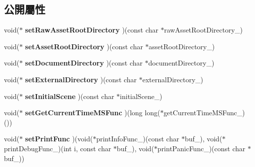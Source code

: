 \subsection*{公開屬性}
\begin{DoxyCompactItemize}
\item 
void($\ast$ {\bfseries set\+Raw\+Asset\+Root\+Directory} )(const char $\ast$raw\+Asset\+Root\+Directory\+\_\+)\hypertarget{class_magnum_1_1_game_descriptor_a81d1d7e45e4f95ffbe11dda12fca0b84}{}\label{class_magnum_1_1_game_descriptor_a81d1d7e45e4f95ffbe11dda12fca0b84}

\item 
void($\ast$ {\bfseries set\+Asset\+Root\+Directory} )(const char $\ast$asset\+Root\+Directory\+\_\+)\hypertarget{class_magnum_1_1_game_descriptor_af83c5b4ae1300af8548a745d417b3624}{}\label{class_magnum_1_1_game_descriptor_af83c5b4ae1300af8548a745d417b3624}

\item 
void($\ast$ {\bfseries set\+Document\+Directory} )(const char $\ast$document\+Directory\+\_\+)\hypertarget{class_magnum_1_1_game_descriptor_acc7208069947e3ec5e28ddadb42ba2dc}{}\label{class_magnum_1_1_game_descriptor_acc7208069947e3ec5e28ddadb42ba2dc}

\item 
void($\ast$ {\bfseries set\+External\+Directory} )(const char $\ast$external\+Directory\+\_\+)\hypertarget{class_magnum_1_1_game_descriptor_a35fb6b4b50d9d10bb9c2b0941be7df18}{}\label{class_magnum_1_1_game_descriptor_a35fb6b4b50d9d10bb9c2b0941be7df18}

\item 
void($\ast$ {\bfseries set\+Initial\+Scene} )(const char $\ast$initial\+Scene\+\_\+)\hypertarget{class_magnum_1_1_game_descriptor_affd4312c62937b1e7437c3deafad0ad8}{}\label{class_magnum_1_1_game_descriptor_affd4312c62937b1e7437c3deafad0ad8}

\item 
void($\ast$ {\bfseries set\+Get\+Current\+Time\+M\+S\+Func} )(long long($\ast$get\+Current\+Time\+M\+S\+Func\+\_\+)())\hypertarget{class_magnum_1_1_game_descriptor_a80dd4ab2bc9140f104c69c2ffedfccf0}{}\label{class_magnum_1_1_game_descriptor_a80dd4ab2bc9140f104c69c2ffedfccf0}

\item 
void($\ast$ {\bfseries set\+Print\+Func} )(void($\ast$print\+Info\+Func\+\_\+)(const char $\ast$buf\+\_\+), void($\ast$print\+Debug\+Func\+\_\+)(int i, const char $\ast$buf\+\_\+), void($\ast$print\+Panic\+Func\+\_\+)(const char $\ast$buf\+\_\+))\hypertarget{class_magnum_1_1_game_descriptor_ab04f2f40ec5b5a0a17fc6076440bc119}{}\label{class_magnum_1_1_game_descriptor_ab04f2f40ec5b5a0a17fc6076440bc119}


\end{DoxyCompactItemize}

